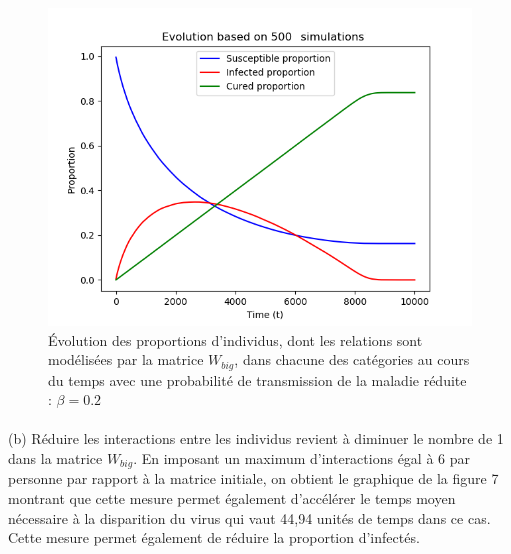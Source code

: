 \documentclass[a4paper, 12pt, oneside]{article}
\begin{document}
\begin{figure}[H]
	\centering
	\includegraphics[scale=1]{Wbig_dense_reduction_transmission.png} 
	\caption{Évolution des proportions d'individus, dont les relations sont modélisées par la matrice $W_{big}$, dans chacune des catégories au cours du temps avec une probabilité de transmission de la maladie réduite : $\beta = 0.2$}
\end{figure}


\paragraph{}(b) Réduire les interactions entre les individus revient à diminuer le nombre de 1 dans la matrice $W_{big}$. En imposant un maximum d'interactions égal à 6 par personne par rapport à la matrice initiale, on obtient le graphique de la figure 7 montrant que cette mesure permet également d'accélérer le temps moyen nécessaire à la disparition du virus qui vaut 44,94 unités de temps dans ce cas. Cette mesure permet également de réduire la proportion d'infectés.
\end{document}

